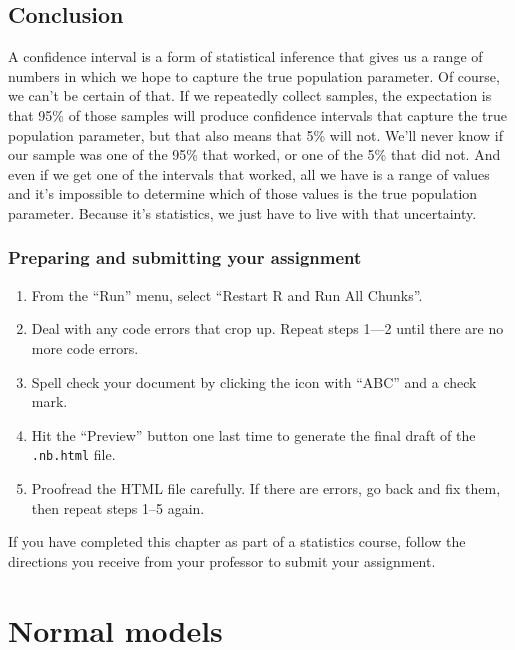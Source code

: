 \documentclass[
]{book}
\providecommand{\tightlist}{%
  \setlength{\itemsep}{0pt}\setlength{\parskip}{0pt}}
\begin{document}
\hypertarget{ci-conclusion}{%
\section{Conclusion}\label{ci-conclusion}}

A confidence interval is a form of statistical inference that gives us a range of numbers in which we hope to capture the true population parameter. Of course, we can't be certain of that. If we repeatedly collect samples, the expectation is that 95\% of those samples will produce confidence intervals that capture the true population parameter, but that also means that 5\% will not. We'll never know if our sample was one of the 95\% that worked, or one of the 5\% that did not. And even if we get one of the intervals that worked, all we have is a range of values and it's impossible to determine which of those values is the true population parameter. Because it's statistics, we just have to live with that uncertainty.

\hypertarget{ci-prep}{%
\subsection{Preparing and submitting your assignment}\label{ci-prep}}

\begin{enumerate}
\def\labelenumi{\arabic{enumi}.}
\tightlist
\item
  From the ``Run'' menu, select ``Restart R and Run All Chunks''.
\item
  Deal with any code errors that crop up. Repeat steps 1---2 until there are no more code errors.
\item
  Spell check your document by clicking the icon with ``ABC'' and a check mark.
\item
  Hit the ``Preview'' button one last time to generate the final draft of the \texttt{.nb.html} file.
\item
  Proofread the HTML file carefully. If there are errors, go back and fix them, then repeat steps 1--5 again.
\end{enumerate}

If you have completed this chapter as part of a statistics course, follow the directions you receive from your professor to submit your assignment.

\hypertarget{normal}{%
\chapter{Normal models}\label{normal}}
\end{document}
